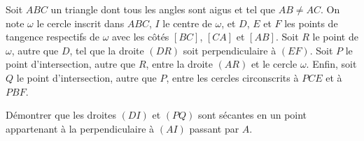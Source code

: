 Soit $ABC$ un triangle dont tous les angles sont aigus et tel que $AB \neq AC$. On note $\omega$ le cercle
inscrit dans $ABC$, $I$ le centre de $\omega$, et $D$, $E$ et $F$ les points de tangence respectifs de $\omega$
avec les côtés $[BC]$, $[CA]$ et $[AB]$. Soit $R$ le point de $\omega$, autre que $D$, tel que la droite $(DR)$
soit perpendiculaire à $(EF)$. Soit $P$ le point d'intersection, autre que $R$, entre la droite $(AR)$ et le
cercle $\omega$. Enfin, soit $Q$ le point d'intersection, autre que $P$, entre les cercles circonscrits à
$PCE$ et à $PBF$.

Démontrer que les droites $(DI)$ et $(PQ)$ sont sécantes en un point appartenant à la perpendiculaire à $(AI)$
passant par $A$.
